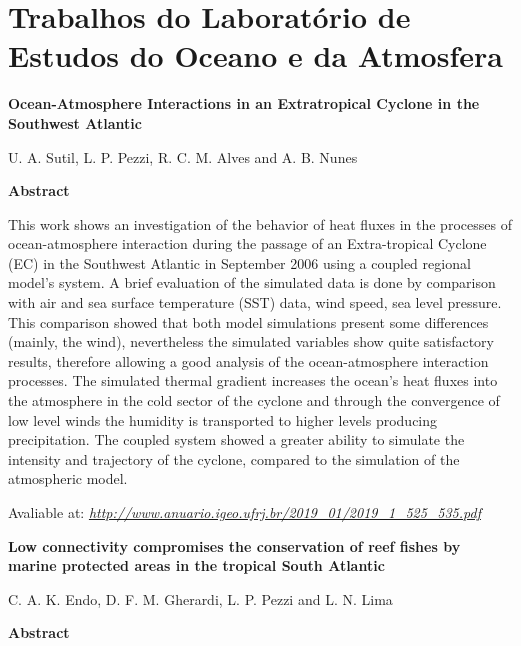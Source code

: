 \chapter{\large{Trabalhos do Laboratório de Estudos do Oceano e da Atmosfera}}
\bigskip


\noindent \begin{center}
\textbf{Ocean-Atmosphere Interactions in an Extratropical Cyclone in the Southwest Atlantic}
\bigskip

\noindent U. A. Sutil, L. P. Pezzi, R. C. M. Alves and A. B. Nunes
\bigskip

\noindent \textbf{Abstract}\end{center}
\bigskip

\noindent This work shows an investigation of the behavior of heat fluxes in the processes of ocean-atmosphere interaction
during the passage of an Extra-tropical Cyclone (EC) in the Southwest Atlantic in September 2006 using a coupled
regional model’s system. A brief evaluation of the simulated data is done by comparison with air and sea surface temperature (SST) data, wind speed, sea level pressure. This comparison showed that both model simulations present some
differences (mainly, the wind), nevertheless the simulated variables show quite satisfactory results, therefore allowing a
good analysis of the ocean-atmosphere interaction processes. The simulated thermal gradient increases the ocean’s heat
fluxes into the atmosphere in the cold sector of the cyclone and through the convergence of low level winds the humidity
is transported to higher levels producing precipitation. The coupled system showed a greater ability to simulate the intensity and trajectory of the cyclone, compared to the simulation of the atmospheric model.
\bigskip

\noindent \textcolor{black}{}
\bigskip

\noindent Avaliable at: \textcolor{bleu_cite}{\href{http://www.anuario.igeo.ufrj.br/2019\_01/2019\_1\_525\_535.pdf}{\textit{http://www.anuario.igeo.ufrj.br/2019\_01/2019\_1\_525\_535.pdf}}}
\bigskip

\newpage
\noindent \begin{center}
\textbf{Low connectivity compromises the conservation of reef fishes by marine protected areas in the tropical South Atlantic}
\bigskip

\noindent C. A. K. Endo, D. F. M. Gherardi, L. P. Pezzi and L. N. Lima
\bigskip

\noindent \textbf{Abstract}\end{center}
\bigskip

